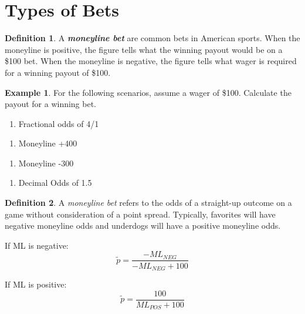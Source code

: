 \documentclass[
  11pt,
]{book}
\providecommand{\tightlist}{%
  \setlength{\itemsep}{0pt}\setlength{\parskip}{0pt}}
\theoremstyle{definition}
\newtheorem{definition}{Definition}[chapter]
\theoremstyle{definition}
\newtheorem{example}{Example}[chapter]
\theoremstyle{definition}
\theoremstyle{definition}
\theoremstyle{remark}
\begin{document}
\newpage

\hypertarget{types-of-bets}{%
\section{Types of Bets}\label{types-of-bets}}

\begin{definition}
A \textbf{\emph{moneyline bet}} are common bets in American sports. When the moneyline is positive, the figure tells what the winning payout would be on a \$100 bet. When the moneyline is negative, the figure tells what wager is required for a winning payout of \$100.
\end{definition}

\begin{example}
For the following scenarios, assume a wager of \$100. Calculate the payout for a winning bet.
\end{example}

\begin{enumerate}
\def\labelenumi{(\alph{enumi})}
\tightlist
\item
  Fractional odds of 4/1\\
\end{enumerate}

\vfill

\begin{enumerate}
\def\labelenumi{(\alph{enumi})}
\setcounter{enumi}{1}
\tightlist
\item
  Moneyline +400\\
\end{enumerate}

\vfill

\begin{enumerate}
\def\labelenumi{(\alph{enumi})}
\setcounter{enumi}{2}
\tightlist
\item
  Moneyline -300\\
\end{enumerate}

\vfill

\begin{enumerate}
\def\labelenumi{(\alph{enumi})}
\setcounter{enumi}{3}
\tightlist
\item
  Decimal Odds of 1.5\\
\end{enumerate}

\vfill

\newpage

\begin{definition}
A \emph{moneyline bet} refers to the odds of a straight-up outcome on a game without consideration of a point spread. Typically, favorites will have negative moneyline odds and underdogs will have a positive moneyline odds.

If ML is negative:
\[\tilde{p} = \frac{-ML_{NEG}}{-ML_{NEG}+100}\]

If ML is positive:
\[\tilde{p} = \frac{100}{ML_{POS}+100}\]
\end{definition}
\end{document}
